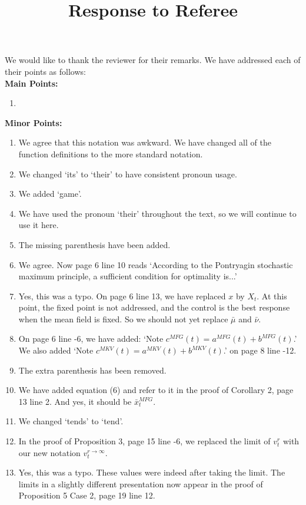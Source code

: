 \documentclass[]{article}
\title{Response to Referee}
\author{}
\begin{document}
\maketitle

We would like to thank the reviewer for their remarks. We have addressed each of their points as follows:\\

\hspace{-7mm} \textbf{Main Points:}
\begin{enumerate}
	\item 
\end{enumerate}

\hspace{-7mm} \textbf{Minor Points:}
\begin{enumerate}
	\item We agree that this notation was awkward. We have changed all of the function definitions to the more standard notation.
	\item We changed `its' to `their' to have consistent pronoun usage.
	\item We added `game'.
	\item We have used the pronoun `their' throughout the text, so we will continue to use it here.
	\item The missing parenthesis have been added.
	\item We agree. Now page 6 line 10 reads `According to the Pontryagin stochastic maximum principle, a sufficient condition for optimality is...'
	\item Yes, this was a typo. On page 6 line 13, we have replaced $x$ by $X_t$. At this point, the fixed point is not addressed, and the control is the best response when the mean field is fixed. So we should not yet replace $\bar{\mu}$ and $\bar{\nu}$.
	\item On page 6 line -6, we have added: `Note $c^{MFG}(t)=a^{MFG}(t)+b^{MFG}(t)$.' We also added `Note $c^{MKV}(t)=a^{MKV}(t)+b^{MKV}(t)$.' on page 8 line -12.
	\item The extra parenthesis has been removed.
	\item We have added equation (6) and refer to it in the proof of Corollary 2, page 13 line 2. And yes, it should be $\bar{x}_t^{MFG}$.
	\item We changed `tends' to `tend'.
	\item In the proof of Proposition 3, page 15 line -6, we replaced the limit of $v^r_t$ with our new notation $v^{r \to \infty}_t$.
	\item Yes, this was a typo. These values were indeed after taking the limit. The limits in a slightly different presentation now appear in the proof of Proposition 5 Case 2, page 19 line 12.
\end{enumerate}
\end{document}
